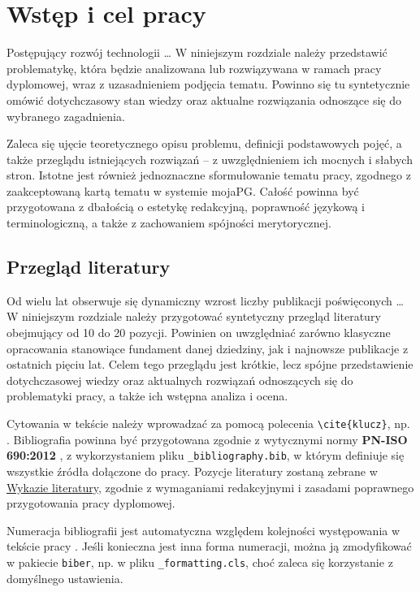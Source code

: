 \chapter{Wstęp i cel pracy}\label{chapter:1_Introduction}
Postępujący rozwój technologii \dots \: W niniejszym rozdziale należy przedstawić problematykę, która będzie analizowana lub rozwiązywana w ramach pracy dyplomowej, wraz z uzasadnieniem podjęcia tematu. Powinno się tu syntetycznie omówić dotychczasowy stan wiedzy oraz aktualne rozwiązania odnoszące się do wybranego zagadnienia.

Zaleca się ujęcie teoretycznego opisu problemu, definicji podstawowych pojęć, a także przeglądu istniejących rozwiązań – z uwzględnieniem ich mocnych i słabych stron. Istotne jest również jednoznaczne sformułowanie tematu pracy, zgodnego z zaakceptowaną kartą tematu w systemie mojaPG. Całość powinna być przygotowana z dbałością o estetykę redakcyjną, poprawność językową i terminologiczną, a także z zachowaniem spójności merytorycznej.

\section{Przegląd literatury}
Od wielu lat obserwuje się dynamiczny wzrost liczby publikacji poświęconych \dots \: W niniejszym rozdziale należy przygotować syntetyczny przegląd literatury obejmujący od 10 do 20 pozycji. Powinien on uwzględniać zarówno klasyczne opracowania stanowiące fundament danej dziedziny, jak i najnowsze publikacje z ostatnich pięciu lat. Celem tego przeglądu jest krótkie, lecz spójne przedstawienie dotychczasowej wiedzy oraz aktualnych rozwiązań odnoszących się do problematyki pracy, a także ich wstępna analiza i ocena.

Cytowania w tekście należy wprowadzać za pomocą polecenia \verb|\cite{klucz}|, np. \cite{DeanGhemawat2004MapReduce}. Bibliografia powinna być przygotowana zgodnie z wytycznymi normy \textbf{PN-ISO 690:2012} , z wykorzystaniem pliku \verb|_bibliography.bib|, w którym definiuje się wszystkie źródła dołączone do pracy. Pozycje literatury \cite{HorowitzHill2015AoE} zostaną zebrane w \hyperref[page:Bibliography]{Wykazie literatury}, zgodnie z wymaganiami redakcyjnymi i zasadami poprawnego przygotowania pracy dyplomowej.

Numeracja bibliografii jest automatyczna względem kolejności występowania w tekście pracy \cite{Kalman1960NewApproach}. Jeśli konieczna jest inna forma numeracji, można ją zmodyfikować w pakiecie \texttt{biber}, np. w pliku \verb|_formatting.cls|, choć zaleca się korzystanie z domyślnego ustawienia.


